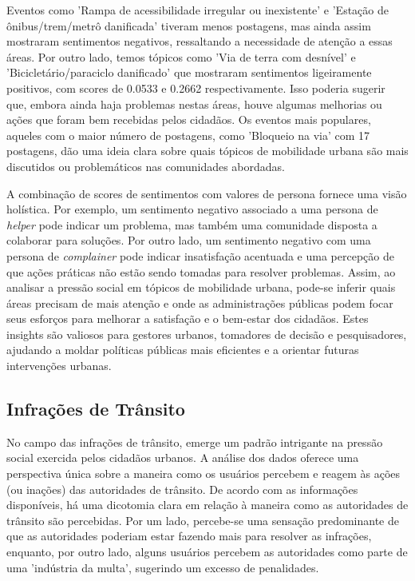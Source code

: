 Eventos como 'Rampa de acessibilidade irregular ou inexistente' e 'Estação de ônibus/trem/metrô danificada' tiveram menos postagens, mas ainda assim mostraram sentimentos negativos, ressaltando a necessidade de atenção a essas áreas. Por outro lado, temos tópicos como 'Via de terra com desnível' e 'Bicicletário/paraciclo danificado' que mostraram sentimentos ligeiramente positivos, com scores de 0.0533 e 0.2662 respectivamente. Isso poderia sugerir que, embora ainda haja problemas nestas áreas, houve algumas melhorias ou ações que foram bem recebidas pelos cidadãos. Os eventos mais populares, aqueles com o maior número de postagens, como 'Bloqueio na via' com 17 postagens, dão uma ideia clara sobre quais tópicos de mobilidade urbana são mais discutidos ou problemáticos nas comunidades abordadas.

A combinação de scores de sentimentos com valores de persona fornece uma visão holística. Por exemplo, um sentimento negativo associado a uma persona de \textit{helper} pode indicar um problema, mas também uma comunidade disposta a colaborar para soluções. Por outro lado, um sentimento negativo com uma persona de \textit{complainer} pode indicar insatisfação acentuada e uma percepção de que ações práticas não estão sendo tomadas para resolver problemas. Assim, ao analisar a pressão social em tópicos de mobilidade urbana, pode-se inferir quais áreas precisam de mais atenção e onde as administrações públicas podem focar seus esforços para melhorar a satisfação e o bem-estar dos cidadãos. Estes insights são valiosos para gestores urbanos, tomadores de decisão e pesquisadores, ajudando a moldar políticas públicas mais eficientes e a orientar futuras intervenções urbanas.

\subsection{Infrações de Trânsito}

No campo das infrações de trânsito, emerge um padrão intrigante na pressão social exercida pelos cidadãos urbanos. A análise dos dados oferece uma perspectiva única sobre a maneira como os usuários percebem e reagem às ações (ou inações) das autoridades de trânsito. De acordo com as informações disponíveis, há uma dicotomia clara em relação à maneira como as autoridades de trânsito são percebidas. Por um lado, percebe-se uma sensação predominante de que as autoridades poderiam estar fazendo mais para resolver as infrações, enquanto, por outro lado, alguns usuários percebem as autoridades como parte de uma 'indústria da multa', sugerindo um excesso de penalidades.

